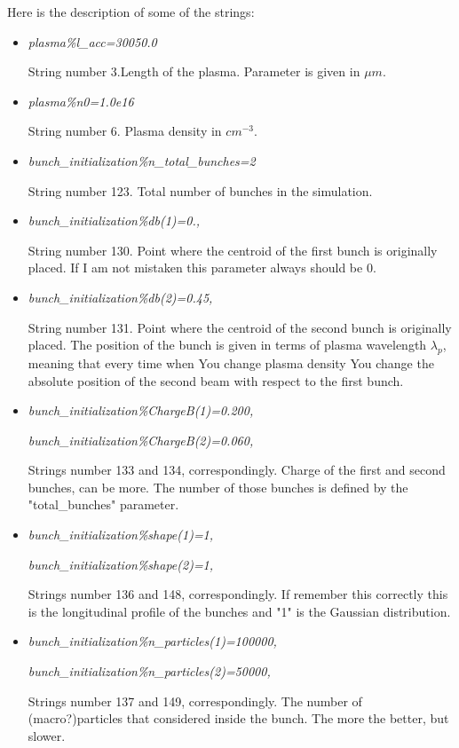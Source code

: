 \documentclass[12pt,a4paper]{article}
\begin{document}
Here is the description of some of the strings: 
\begin{itemize}
\item{\textit{plasma\%l\_acc=30050.0} 

String number 3.Length of the plasma. Parameter is given in $\mu m$.}
\item{\textit{plasma\%n0=1.0e16}

String number 6. Plasma density in $cm^{-3}$.}
\item{\textit{bunch\_initialization\%n\_total\_bunches=2} 

String number 123. Total number of bunches in the simulation.}

\item{\textit{bunch\_initialization\%db(1)=0.,} 

String number 130. Point where the centroid of the first bunch is originally placed. If I am not mistaken this parameter always should be 0.}

\item{\textit{bunch\_initialization\%db(2)=0.45,} 

String number 131. Point where the centroid of the second bunch is originally placed. The position of the bunch is given in terms of plasma wavelength $\lambda_p$, meaning that every time when You change plasma density You change the absolute position of the second beam with respect to the first bunch.}

\item{\textit{bunch\_initialization\%ChargeB(1)=0.200,}

\textit{bunch\_initialization\%ChargeB(2)=0.060,} 

Strings number 133 and 134, correspondingly. Charge of the first and second bunches, can be more. The number of those bunches is defined by the "total\_bunches" parameter.}

\item{\textit{bunch\_initialization\%shape(1)=1,}

\textit{bunch\_initialization\%shape(2)=1,} 

Strings number 136 and 148, correspondingly. If remember this correctly this is the longitudinal profile of the bunches and "1" is the Gaussian distribution.}


\item{\textit{bunch\_initialization\%n\_particles(1)=100000,}

\textit{bunch\_initialization\%n\_particles(2)=50000,} 

Strings number 137 and 149, correspondingly. The number of (macro?)particles that considered inside the bunch. The more the better, but slower.}


\end{itemize}
\end{document}
